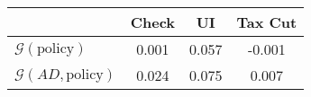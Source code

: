 \begin{tabular}{@{}lccc@{}}
\toprule
                          & Check      & UI    & Tax Cut    \\  \midrule
$\mathcal{G}(\text{policy})$ & 0.001  & 0.057  & -0.001     \\
$\mathcal{G}(AD,\text{policy})$ & 0.024  & 0.075  & 0.007     \\
\end{tabular}
